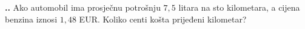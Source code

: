 
\noindent 
\textbf{
\thecjelina.\thezadatak.}
Ako automobil ima prosječnu potrošnju $7,5$ litara na sto kilometara, a cijena benzina iznosi $1,48$ EUR. Koliko centi košta prijeđeni  kilometar?
